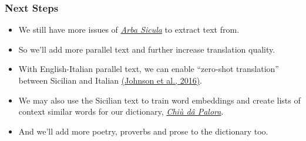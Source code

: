 \documentclass{beamer}
\begin{document}
\begin{frame}
  \frametitle{Next Steps}
  \vspace{-1.0em}
  \begin{itemize}
  \item We still have more issues of \href{https://www.arbasicula.org/}{\textit{Arba Sicula}} to extract text from.
  \item So we'll add more parallel text and further increase translation quality.
    \vspace{1em}
  \item With English-Italian parallel text, we can enable ``zero-shot translation'' between Sicilian and Italian
    \href{https://arxiv.org/abs/1611.04558}{(Johnson et al., 2016)}.
    \vspace{1em}
  \item We may also use the Sicilian text to train word embeddings and create lists of context similar words for our dictionary,
    \href{https://www.napizia.com/cgi-bin/cchiu-da-palora.pl}{\textit{Chiù dâ Palora}}.
    \vspace{1em}
    \item And we'll add more poetry, proverbs and prose to the dictionary too.
  \end{itemize}
\end{frame}

\end{document}
